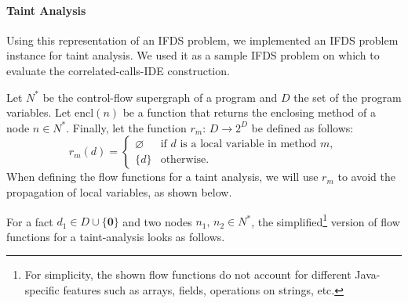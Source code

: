 \paragraph{Taint Analysis}
Using this representation of an IFDS problem, we implemented an IFDS problem instance for taint analysis. We used it as a sample IFDS problem on which to evaluate the correlated-calls-IDE construction.

Let $N^*$ be the control-flow supergraph of a program and $D$ the set of the program variables.
Let \textsf{encl}$(n)$ be a function that returns the enclosing method of a node $n\in N^*$. Finally, let the function $r_m:\,D\to 2^D$ be defined as follows:
\begin{equation}
  r_m(d)=\begin{cases}
                \varnothing&\text{if }d\text{ is a local variable in method }m,\\
                \{d\}&\text{otherwise.}
              \end{cases}
\end{equation}
When defining the flow functions for a taint analysis, we will use $r_m$ to avoid the propagation of local variables, as shown below.

For a fact $d_1\in D\cup\{\mathbf0\}$ and two nodes $n_1,\,n_2\in N^*$, the simplified\footnote{For simplicity, the shown flow functions do not account for different Java-specific features such as arrays, fields, operations on strings, etc.} version of flow functions for a taint-analysis looks as follows.

